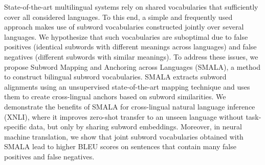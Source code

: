 State-of-the-art multilingual systems rely on shared vocabularies that sufficiently cover all considered languages.  To this end, a  simple and frequently used approach makes use of subword vocabularies constructed jointly over several languages. We hypothesize that such vocabularies are suboptimal due to false positives (identical subwords with different meanings across languages) and false negatives (different subwords with similar meanings).  To address these issues, we propose Subword Mapping and Anchoring across Languages (SMALA), a method to construct bilingual subword vocabularies. SMALA extracts subword alignments using an unsupervised state-of-the-art mapping technique and uses them to create cross-lingual anchors based on subword similarities. We demonstrate the benefits of SMALA for cross-lingual natural language inference (XNLI), where it improves zero-shot transfer to an unseen language without task-specific data, but only by sharing subword embeddings.  Moreover, in neural machine translation, we show that joint subword vocabularies obtained with SMALA lead to higher BLEU scores on sentences that contain many false positives and false negatives.
